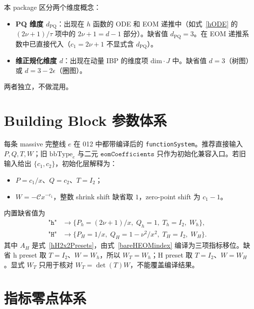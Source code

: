﻿\documentclass[a4paper,11pt]{article}
\begin{document}
本 package 区分两个维度概念：

\begin{itemize}
  \item \textbf{PQ 维度 $d_{\text{PQ}}$}：出现在 $h$ 函数的 ODE 和 EOM 递推中（如式~\eqref{hODE} 的 $(2\nu+1)/\tau$ 项中的 $2\nu+1 = d-1$ 部分）。缺省值 $d_{\text{PQ}} = 3$。在 EOM 递推系数中已直接代入（$c_1 = 2\nu+1$ 不显式含 $d_{\text{PQ}}$）。
  \item \textbf{维正规化维度 $d$}：出现在动量 IBP 的维度项 $\text{dim} \cdot J$ 中。缺省值 $d = 3$（树图）或 $d = 3 - 2\epsilon$（圈图）。
\end{itemize}

两者独立，不做混用。

\section{Building Block 参数体系}

每条 massive 完整线 $e$ 在 012 中都带编译后的 \texttt{functionSystem}。推荐直接输入 $P,Q,T,W$；旧 $\text{bbType}_e$ 与二元 $\texttt{eomCoefficients}$ 只作为初始化兼容入口。若旧输入给出 $\{c_1,c_2\}$，初始化层解释为：

\begin{itemize}
  \item $P=c_1/x$、$Q=c_2$、$T=I_2$；
  \item $W=-\mathcal C x^{-c_1}$，整数 shrink shift 缺省取 $1$，zero-point shift 为 $c_1-1$。
\end{itemize}

内置缺省值为
\begin{align}
  \texttt{"h"} &\to \{P_h=(2\nu+1)/x,\;Q_h=1,\;T_h=I_2,\;W_h\}, \label{bbH} \\
  \texttt{"H"} &\to \{P_H=1/x,\;Q_H=1-\nu^2/x^2,\;T_H=I_2,\;W_H\}. \label{bbHankel}
\end{align}
其中 $A_H$ 是式~\eqref{hH2x2Presets}，由式~\eqref{bareHEOMindex} 编译为三项指标移位。缺省 h preset 取 $T=I_2$、$W=W_h$，所以 $W_T=W_h$；H preset 取 $T=I_2$、$W=W_H$。显式 $W_T$ 只用于核对 $W_T=\det(T)W$，不能覆盖编译结果。

\section{指标零点体系}
\end{document}
